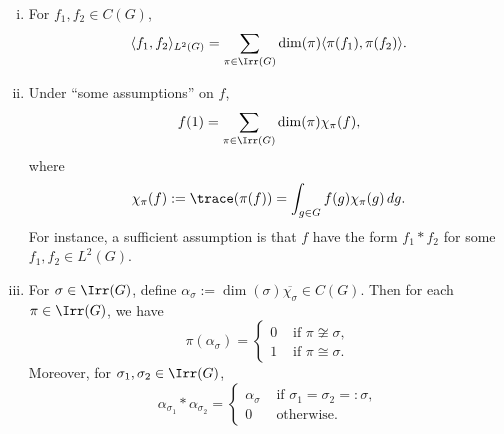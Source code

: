 \documentclass[reqno]{amsart} 
\begin{document}
\begin{theorem}
  \begin{enumerate}
[(i)]
  \item For $f_1, f_2 \in C(G)$,
    \begin{equation*}
      \langle f_1, f_2 \rangle_{L^2(G)} = \sum_{\pi \in \Irr(G)} \dim(\pi) \langle \pi(f_1), \pi(f_2) \rangle.
    \end{equation*}
  \item Under ``some assumptions'' on $f$,
    \begin{equation}\label{eq:pointwise-fourier-expn}
      f(1)
      = \sum_{\pi \in \Irr(G)}
      \dim(\pi) \chi_\pi(f),
    \end{equation}
    where
    \begin{equation*}
      \chi_\pi(f) := \trace(\pi(f)) = \int_{g \in G} f(g) \chi_\pi(g) \, d g.
    \end{equation*}
    For instance, a sufficient assumption is that $f$ have the form $f_1 \ast f_2$ for some $f_1, f_2 \in L^2(G)$.
  \item For $\sigma \in \Irr(G)$, define $\alpha_\sigma := \dim(\sigma) \overline{\chi_\sigma } \in C(G)$.  Then for each $\pi \in \Irr(G)$, we have
    \begin{equation}\label{eq:alpha-sigma-acts-on-pi}
      \pi(\alpha_\sigma)
      = 
\begin{cases}
        0  & \text{ if } \pi \not\cong \sigma, \\
        1 & \text{ if } \pi \cong \sigma.
      \end{cases}
    \end{equation}
    Moreover, for $\sigma_1, \sigma_2 \in \Irr(G)$,
    \begin{equation}\label{eqn:convolving-idemps}
      \alpha_{\sigma_1} \ast \alpha_{\sigma_2}
      = 
\begin{cases}
        \alpha_{\sigma} & \text{ if }
        \sigma_1 = \sigma_2 =: \sigma, \\
        0 & \text{ otherwise}.
      \end{cases}
    \end{equation}
  \end{enumerate}
\end{theorem}
\end{document}

